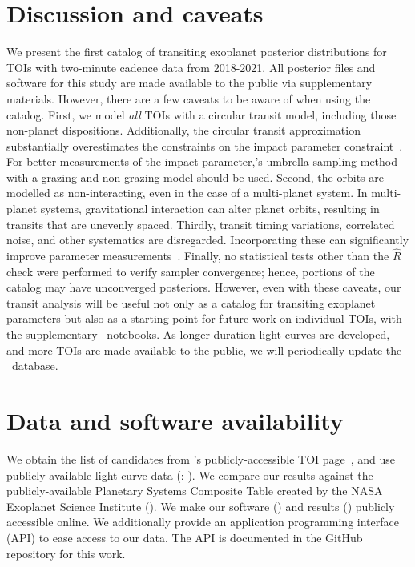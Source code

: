 \documentclass[floatfix,ApJL,twocolumn]{aastex631}
\begin{document}
\section{Discussion and caveats}\label{sec:conclusion}
We present the first catalog of transiting exoplanet posterior distributions for TOIs with two-minute cadence data from 2018-2021. 
All posterior files and software for this study are made available to the public via supplementary materials.
However, there are a few caveats to be aware of when using the catalog.
First, we model \textit{all} TOIs with a circular transit model, including those non-planet dispositions.
Additionally, the circular transit approximation substantially overestimates the constraints on the impact parameter constraint~\citep 
{Gilbert:2022:AJ}. For better measurements of the impact parameter,\citet{Gilbert:2022:AJ}'s umbrella sampling method with a grazing and non-grazing model should be used. 
Second, the orbits are modelled as non-interacting, even in the case of a multi-planet system. In multi-planet systems, gravitational interaction can alter planet orbits, resulting in transits that are unevenly spaced.
Thirdly, transit timing variations, correlated noise, and other systematics are disregarded.
Incorporating these can significantly improve parameter measurements~\cite{Coughlin:2016:ApJS, Thompson:2018:ApJS}. 
Finally, no statistical tests other than the $\hat{R}$ check were performed to verify sampler convergence; hence, portions of the catalog may have unconverged posteriors.
However, even with these caveats, our transit analysis will be useful not only as a catalog for transiting exoplanet parameters but also as a starting point for future work on individual TOIs, with the supplementary \jupyter\ notebooks.
As longer-duration light curves are developed, and more TOIs are made available to the public, we will periodically update the \tessAtlas\ database.

\section{Data and software availability}\label{sec:data}
We obtain the list of candidates from \exofop's publicly-accessible TOI page~\citep{Akeson:2013:PASP}, and use publicly-available light curve data (\mast: \mastDatabase). We compare our results against the publicly-available Planetary Systems Composite Table created by the NASA Exoplanet Science Institute (\confirmedPlanetsDb). We make our software (\atlasGit) and results (\atlasUrl) publicly accessible online. We additionally provide an application programming interface (API) to ease access to our data. The API is documented in the GitHub repository for this work. 
\end{document}
